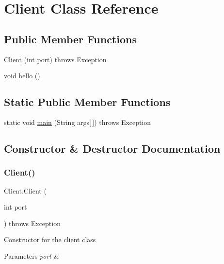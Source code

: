 \hypertarget{class_client}{}\section{Client Class Reference}
\label{class_client}
\subsection*{Public Member Functions}
\begin{DoxyCompactItemize}
\item 
\mbox{\hyperlink{class_client_a1862ab048047a5917b5e6a01bf38b78e}{Client}} (int port)  throws Exception 
\item 
void \mbox{\hyperlink{class_client_a3da0518f6e8503b0b669af247ddfcf62}{hello}} ()
\end{DoxyCompactItemize}
\subsection*{Static Public Member Functions}
\begin{DoxyCompactItemize}
\item 
static void \mbox{\hyperlink{class_client_ac4219c51358857184ceeb023ada3d8ae}{main}} (String args\mbox{[}$\,$\mbox{]})  throws Exception     
\end{DoxyCompactItemize}


\subsection{Constructor \& Destructor Documentation}
\mbox{\label{class_client_a1862ab048047a5917b5e6a01bf38b78e}} 
\subsubsection{\texorpdfstring{Client()}{Client()}}
{\footnotesize\ttfamily Client.\+Client (\begin{DoxyParamCaption}\item[{int}]{port }\end{DoxyParamCaption}) throws Exception\hspace{0.3cm}{\ttfamily [inline]}}

Constructor for the client class 
\begin{DoxyParams}{Parameters}
{\em port} & \\
\hline
\end{DoxyParams}

